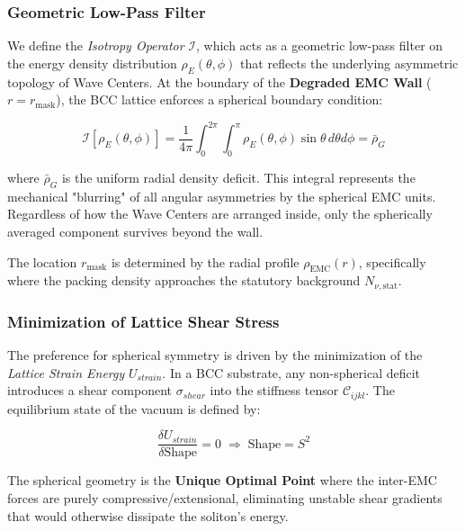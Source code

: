 \documentclass[10pt,a4paper]{article}
\begin{document}
\subsubsection{Geometric Low-Pass Filter}
We define the \textit{Isotropy Operator} $\mathcal{I}$, which acts as a geometric low-pass filter on the energy density distribution $\rho_E(\theta, \phi)$ that reflects the underlying asymmetric topology of Wave Centers. At the boundary of the \textbf{Degraded EMC Wall} ($r = r_{\text{mask}}$), the BCC lattice enforces a spherical boundary condition:

\begin{equation}
	\mathcal{I}[\rho_E(\theta, \phi)] = \frac{1}{4\pi} \int_0^{2\pi} \int_0^\pi \rho_E(\theta, \phi) \sin\theta\, d\theta d\phi = \bar{\rho}_G
\end{equation}

where $\bar{\rho}_G$ is the uniform radial density deficit. This integral represents the mechanical "blurring" of all angular asymmetries by the spherical EMC units. Regardless of how the Wave Centers are arranged inside, only the spherically averaged component survives beyond the wall.

The location $r_{\text{mask}}$ is determined by the radial profile $\rho_{\text{EMC}}(r)$, specifically where the packing density approaches the statutory background $N_{\nu,\text{stat}}$.

\subsubsection{Minimization of Lattice Shear Stress}
The preference for spherical symmetry is driven by the minimization of the \textit{Lattice Strain Energy} $U_{strain}$. In a BCC substrate, any non-spherical deficit introduces a shear component $\sigma_{shear}$ into the stiffness tensor $\mathcal{C}_{ijkl}$. The equilibrium state of the vacuum is defined by:

\begin{equation}
	\frac{\delta U_{strain}}{\delta \text{Shape}} = 0 \;\Longrightarrow\; \text{Shape} = S^2
\end{equation}

The spherical geometry is the \textbf{Unique Optimal Point} where the inter-EMC forces are purely compressive/extensional, eliminating unstable shear gradients that would otherwise dissipate the soliton's energy.
\end{document}
